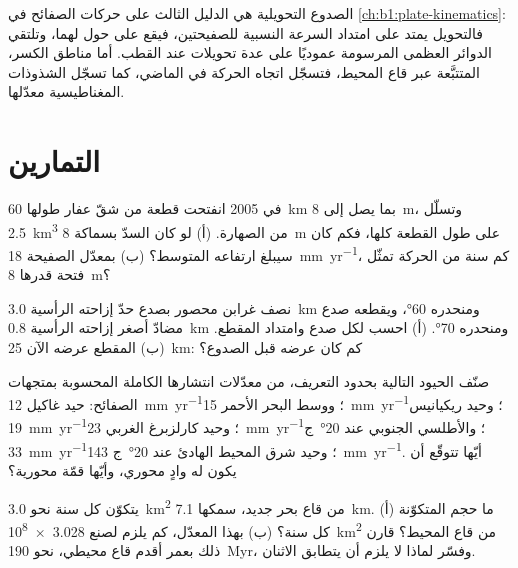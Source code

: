 الصدوع التحويلية هي الدليل الثالث على حركات الصفائح في \cref{ch:b1:plate-kinematics}: فالتحويل يمتد على امتداد السرعة النسبية للصفيحتين، فيقع على  حول  لهما، وتلتقي الدوائر العظمى المرسومة عموديًا على عدة تحويلات عند القطب. أما مناطق الكسر، المتتبَّعة عبر قاع المحيط، فتسجّل اتجاه الحركة في الماضي، كما تسجّل الشذوذات المغناطيسية معدّلها.

\section{التمارين}

\begin{exercise}[$\star$]\label{exo:b1:rifts-ridges-margins:1}
في 2005 انفتحت قطعة من شقّ عفار طولها \qty{60}{km} بما يصل إلى \qty{8}{m}، وتسلّل \qty{2.5}{km^3} من الصهارة. (أ) لو كان السدّ بسماكة \qty{8}{m} على طول القطعة كلها، فكم كان سيبلغ ارتفاعه المتوسط؟ (ب) بمعدّل الصفيحة \qty{18}{mm.yr^{-1}}، كم سنة من الحركة تمثّل فتحة قدرها \qty{8}{m}؟
\end{exercise}

\begin{exercise}[$\star$]\label{exo:b1:rifts-ridges-margins:2}
نصف غرابن محصور بصدع حدّ إزاحته الرأسية \qty{3.0}{km} ومنحدره \ang{60}، ويقطعه صدع مضادّ أصغر إزاحته الرأسية \qty{0.8}{km} ومنحدره \ang{70}. (أ) احسب  لكل صدع وامتداد المقطع. (ب) المقطع عرضه الآن \qty{25}{km}: كم كان عرضه قبل الصدوع؟
\end{exercise}

\begin{exercise}[$\star$]\label{exo:b1:rifts-ridges-margins:3}
صنّف الحيود التالية بحدود التعريف، من معدّلات انتشارها الكاملة المحسوبة بمتجهات الصفائح: حيد غاكيل \qty{12}{mm.yr^{-1}}؛ ووسط البحر الأحمر \qty{15}{mm.yr^{-1}}؛ وحيد ريكيانيس \qty{19}{mm.yr^{-1}}؛ وحيد كارلزبرغ الغربي \qty{23}{mm.yr^{-1}}؛ والأطلسي الجنوبي عند \ang{20}~ج \qty{33}{mm.yr^{-1}}؛ وحيد شرق المحيط الهادئ عند \ang{20}~ج \qty{143}{mm.yr^{-1}}. أيّها تتوقّع أن يكون له وادٍ محوري، وأيّها قمّة محورية؟
\end{exercise}

\begin{exercise}[$\star$]\label{exo:b1:rifts-ridges-margins:4}
يتكوّن كل سنة نحو \qty{3.0}{km^2} من قاع بحر جديد،  سمكها \qty{7.1}{km}. (أ) ما حجم  المتكوّنة كل سنة؟ (ب) بهذا المعدّل، كم يلزم لصنع \qty{3.028e8}{km^2} من قاع المحيط؟ قارن ذلك بعمر أقدم قاع محيطي، نحو \qty{190}{Myr}، وفسّر لماذا لا يلزم أن يتطابق الاثنان.
\end{exercise}

